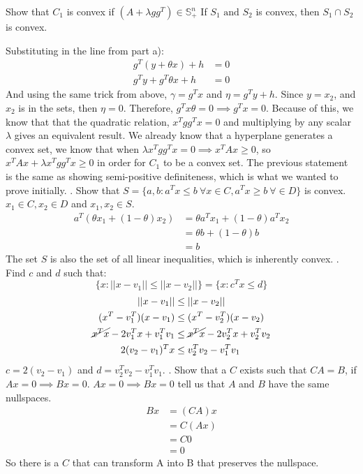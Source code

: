 \documentclass{article}
\begin{document}
Show that $C_1$ is convex if $(A + \lambda gg^T) \in \mathbb{S}^n_+$
If $S_1 \text{ and } S_2$ is convex, then $S_1 \cap S_2$ is convex. \par
\noindent
Substituting in the line from part a):
\begin{align*}
	g^T(y + \theta x)  + h &= 0 \\
	g^Ty + g^T\theta x + h &= 0
\end{align*}
And using the same trick from above, $\gamma = g^Tx$ and $\eta = g^Ty + h$. Since $y = x_2$, and $x_2$ is in the sets, then $\eta = 0$. Therefore, $g^Tx\theta = 0 \implies g^Tx = 0$. Because of this, we know that that the quadratic relation, $x^Tgg^Tx = 0$ and multiplying by any scalar $\lambda$ gives an equivalent result. We already know that a hyperplane generates a convex set, we know that when $\lambda x^Tgg^Tx = 0 \implies x^TAx \geq 0$, so $ x^TAx + \lambda x^Tgg^Tx \geq 0$ in order for $C_1$ to be a convex set. The previous statement is the same as showing semi-positive definiteness, which is what we wanted to prove initially. 
\newpage
{}. Show that $ S = \{a, b : a^Tx \leq b \ \forall x \in C, a^Tx \geq b \ \forall \in D \}$ is convex. 
$x_1 \in C, x_2 \in D$ and $x_1, x_2 \in S$.
\begin{align*}
	a^T(\theta x_1 + (1-\theta)x_2) &= \theta a^Tx_1 + (1-\theta)a^Tx_2 \\
	&= \theta b + (1-\theta)b \\
	&= b
\end{align*}
The set $S$ is also the set of all linear inequalities, which is inherently convex. 
\newline{}. Find $c$ and $d$ such that:
\begin{equation*}
	\{ x : ||x - v_1|| \leq ||x - v_2|| \} = \{x : c^Tx \leq d\}
\end{equation*}
\begin{align*}
	||x - v_1|| &\leq ||x - v_2|| \\
	(x^T - v_1^T)(x - v_1) &\leq (x^T - v_2^T)(x - v_2) \\
	\cancel{x^Tx} - 2v_1^Tx + v_1^Tv_1 &\leq \cancel{x^Tx} - 2v_2^Tx + v_2^Tv_2 \\
	2(v_2 - v_1)^Tx &\leq v_2^Tv_2 - v_1^Tv_1
\end{align*}
$c = 2(v_2 - v_1)$ and $d = v_2^Tv_2 - v_1^Tv_1 $. 
\newline{}. Show that a $C$ exists such that $CA = B$, if $Ax = 0 \implies Bx = 0$. 
$Ax = 0 \implies Bx = 0$ tell us that $A$ and $B$ have the same nullspaces. 
\begin{align*}
	Bx &= (CA)x \\
	&= C(Ax) \\
	&= C0 \\
	&= 0
\end{align*}
So there is a $C$ that can transform A into B that preserves the nullspace. 
\end{document}
